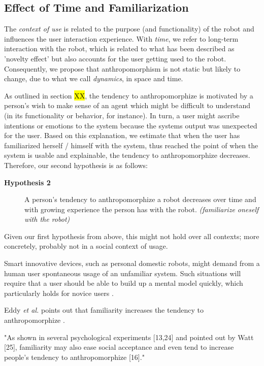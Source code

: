 \documentclass[twocolumn]{svjour3}          %
\begin{document}
\subsection{Effect of Time and Familiarization}
\label{sec:8.2}

	The \textit{context of use} is related to the purpose (and functionality) of the robot and influences the user interaction experience. With \textit{time}, we refer to long-term interaction with the robot, which is related to what has been described as 'novelty effect' but also accounts for the user getting used to the robot. Consequently, we propose that anthropomorphism is not static but likely to change, due to what we call \textit{dynamics}, in space and time.


	As outlined in section \hl{XX}, the tendency to anthropomorphize is motivated by a person's wish to make sense of an agent which might be difficult to understand (in its functionality or behavior, for instance). In turn, a user might ascribe intentions or emotions to the system because the systems output was unexpected for the user. Based on this explanation, we estimate that when the user has familiarized herself / himself with the system, thus reached the point of when the system is usable and explainable, the tendency to anthropomorphize decreases. Therefore, our second hypothesis is as follows: 

\begin{description}
	\item[\textbf{Hypothesis 2}] A person's tendency to anthropomorphize a robot decreases over time and with growing experience the person has with the robot. \textit{(familiarize oneself with the robot)}
\end{description}	
	

Given our first hypothesis from above, this might not hold over all contexts; more concretely, probably not in a social context of usage.


	Smart innovative devices, such as personal domestic robots, might demand from a human user spontaneous usage of an unfamiliar system. Such situations will require that a user should be able to build up a mental model quickly, which particularly holds for novice users \cite{schmitz_concepts_2011}.

	Eddy \textit{et al.} points out that familiarity increases the tendency to anthropomorphize \cite{eddy_attribution_1993}.

	"As shown in several psychological experiments [13,24] and pointed out by Watt [25], familiarity may also ease social acceptance and even tend to increase people's tendency to anthropomorphize [16]." \cite{duffy_anthropomorphism_2003}
\end{document}
